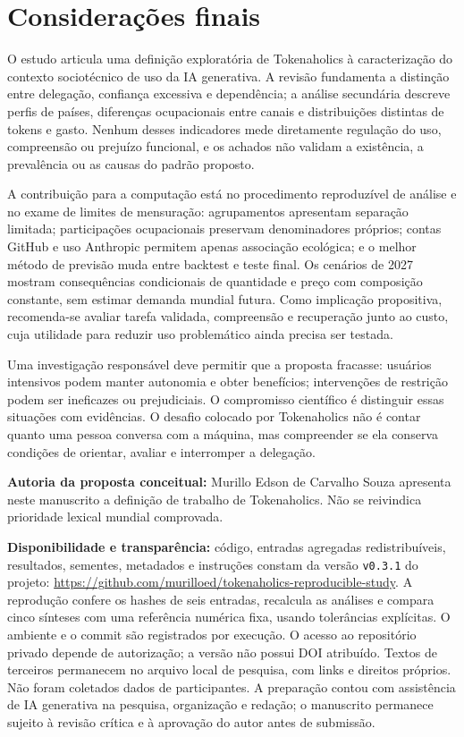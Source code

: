\documentclass[11pt,a4paper]{article}
\begin{document}
\section{Considerações finais}
O estudo articula uma definição exploratória de Tokenaholics à caracterização do contexto sociotécnico de uso da IA generativa. A revisão fundamenta a distinção entre delegação, confiança excessiva e dependência; a análise secundária descreve perfis de países, diferenças ocupacionais entre canais e distribuições distintas de tokens e gasto. Nenhum desses indicadores mede diretamente regulação do uso, compreensão ou prejuízo funcional, e os achados não validam a existência, a prevalência ou as causas do padrão proposto.

A contribuição para a computação está no procedimento reproduzível de análise e no exame de limites de mensuração: agrupamentos apresentam separação limitada; participações ocupacionais preservam denominadores próprios; contas GitHub e uso Anthropic permitem apenas associação ecológica; e o melhor método de previsão muda entre backtest e teste final. Os cenários de 2027 mostram consequências condicionais de quantidade e preço com composição constante, sem estimar demanda mundial futura. Como implicação propositiva, recomenda-se avaliar tarefa validada, compreensão e recuperação junto ao custo, cuja utilidade para reduzir uso problemático ainda precisa ser testada.

Uma investigação responsável deve permitir que a proposta fracasse: usuários intensivos podem manter autonomia e obter benefícios; intervenções de restrição podem ser ineficazes ou prejudiciais. O compromisso científico é distinguir essas situações com evidências. O desafio colocado por Tokenaholics não é contar quanto uma pessoa conversa com a máquina, mas compreender se ela conserva condições de orientar, avaliar e interromper a delegação.

\noindent\textbf{Autoria da proposta conceitual:} Murillo Edson de Carvalho Souza apresenta neste manuscrito a definição de trabalho de Tokenaholics. Não se reivindica prioridade lexical mundial comprovada.

\medskip
\noindent\textbf{Disponibilidade e transparência:} código, entradas agregadas redistribuíveis, resultados, sementes, metadados e instruções constam da versão \texttt{v0.3.1} do projeto: \url{https://github.com/murilloed/tokenaholics-reproducible-study}. A reprodução confere os hashes de seis entradas, recalcula as análises e compara cinco sínteses com uma referência numérica fixa, usando tolerâncias explícitas. O ambiente e o commit são registrados por execução. O acesso ao repositório privado depende de autorização; a versão não possui DOI atribuído. Textos de terceiros permanecem no arquivo local de pesquisa, com links e direitos próprios. Não foram coletados dados de participantes. A preparação contou com assistência de IA generativa na pesquisa, organização e redação; o manuscrito permanece sujeito à revisão crítica e à aprovação do autor antes de submissão.



\end{document}
